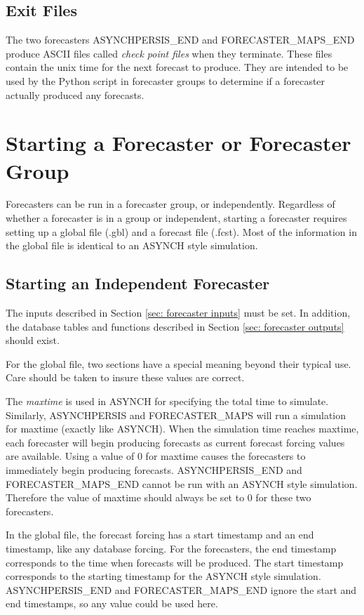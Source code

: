 \documentclass[12pt]{article}
\begin{document}
\subsection{Exit Files} \label{sec: exit files}

The two forecasters ASYNCHPERSIS\_END and FORECASTER\_MAPS\_END produce ASCII files called \emph{check point files} when they terminate. These files contain the unix time for the next forecast to produce. They are intended to be used by the Python script in forecaster groups to determine if a forecaster actually produced any forecasts.


\section{Starting a Forecaster or Forecaster Group} \label{sec: starting}

Forecasters can be run in a forecaster group, or independently. Regardless of whether a forecaster is in a group or independent, starting a forecaster requires setting up a global file (.gbl) and a forecast file (.fcst). Most of the information in the global file is identical to an ASYNCH style simulation.

\subsection{Starting an Independent Forecaster} \label{sec: starting independent forecaster}

The inputs described in Section \ref{sec: forecaster inputs} must be set. In addition, the database tables and functions described in Section \ref{sec: forecaster outputs} should exist.

For the global file, two sections have a special meaning beyond their typical use. Care should be taken to insure these values are correct.

The \emph{maxtime} is used in ASYNCH for specifying the total time to simulate. Similarly, ASYNCHPERSIS and FORECASTER\_MAPS will run a simulation for maxtime (exactly like ASYNCH). When the simulation time reaches maxtime, each forecaster will begin producing forecasts as current forecast forcing values are available. Using a value of 0 for maxtime causes the forecasters to immediately begin producing forecasts. ASYNCHPERSIS\_END and FORECASTER\_MAPS\_END cannot be run with an ASYNCH style simulation. Therefore the value of maxtime should always be set to 0 for these two forecasters.

In the global file, the forecast forcing has a start timestamp and an end timestamp, like any database forcing. For the forecasters, the end timestamp corresponds to the time when forecasts will be produced. The start timestamp corresponds to the starting timestamp for the ASYNCH style simulation. ASYNCHPERSIS\_END and FORECASTER\_MAPS\_END ignore the start and end timestamps, so any value could be used here.
\end{document}

